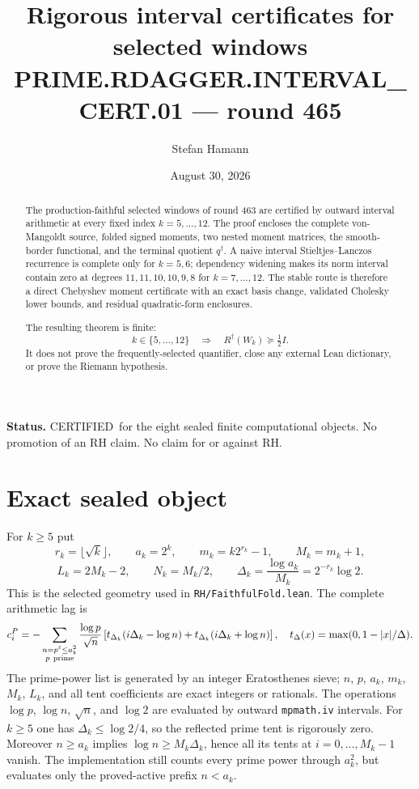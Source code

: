 \documentclass[11pt]{article}
\title{\bfseries Rigorous interval certificates for selected windows\\[2mm]
\large PRIME.RDAGGER.INTERVAL\_CERT.01 --- round 465}
\author{Stefan Hamann}
\date{August 30, 2026}
\theoremstyle{remark}
\newcommand{\Rd}{R^{\dagger}}
\newcommand{\qdag}{q^{\dagger}}
\newcommand{\cert}{\textcolor{green!40!black}{CERTIFIED}}
\begin{document}
\maketitle

\begin{abstract}\noindent
The production-faithful selected windows of round 463 are certified by
outward interval arithmetic at every fixed index $k=5,\ldots,12$.
The proof encloses the complete von-Mangoldt source, folded signed
moments, two nested moment matrices, the smooth-border functional, and
the terminal quotient $\qdag$.  A naive interval Stieltjes--Lanczos
recurrence is complete only for $k=5,6$; dependency widening makes its
norm interval contain zero at degrees $11,11,10,10,9,8$ for
$k=7,\ldots,12$.  The stable route is therefore a direct Chebyshev
moment certificate with an exact basis change, validated Cholesky
lower bounds, and residual quadratic-form enclosures.

The resulting theorem is finite:
\[
 k\in\{5,\ldots,12\}\quad\Longrightarrow\quad
 \Rd(W_k)\succeq\tfrac12 I .
\]
It does not prove the frequently-selected quantifier, close any
external Lean dictionary, or prove the Riemann hypothesis.
\end{abstract}

\medskip\noindent
\textbf{Status.}\enspace
\cert\ for the eight sealed finite computational objects.
No promotion of an RH claim.  No claim for or against RH.

\section{Exact sealed object}

For $k\ge5$ put
\[
 r_k=\lfloor\sqrt{k}\rfloor,\qquad
 a_k=2^k,\qquad m_k=k2^{r_k}-1,\qquad
 M_k=m_k+1,
\]
\[
 L_k=2M_k-2,\qquad N_k=M_k/2,\qquad
 \Delta_k=\frac{\log a_k}{M_k}=2^{-r_k}\log2 .
\]
This is the selected geometry used in
\texttt{RH/FaithfulFold.lean}.  The complete arithmetic lag is
\[
 c_i^P=-\sum_{\substack{n=p^\ell\le a_k^2\\p\ {\rm prime}}}
 \frac{\log p}{\sqrt n}
 \left[
 t_{\Delta_k}(i\Delta_k-\log n)
 +t_{\Delta_k}(i\Delta_k+\log n)
 \right],
\quad
 t_\Delta(x)=\max(0,1-|x|/\Delta).
\]
The prime-power list is generated by an integer Eratosthenes sieve;
$n$, $p$, $a_k$, $m_k$, $M_k$, $L_k$, and all tent coefficients are
exact integers or rationals.  The operations $\log p$, $\log n$,
$\sqrt n$, and $\log2$ are evaluated by outward
\texttt{mpmath.iv} intervals.  For $k\ge5$ one has
$\Delta_k\le\log2/4$, so the reflected prime tent is rigorously zero.
Moreover $n\ge a_k$ implies
$\log n\ge M_k\Delta_k$, hence all its tents at
$i=0,\ldots,M_k-1$ vanish.  The implementation still counts every
prime power through $a_k^2$, but evaluates only the proved-active
prefix $n<a_k$.
\end{document}
